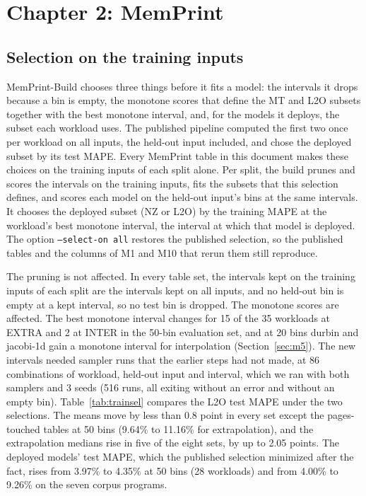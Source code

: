 \documentclass[11pt]{article}
\newcommand{\memprint}{MemPrint}
\begin{document}
\section{Chapter 2: \memprint{}}
\label{sec:ch2}

\subsection{Selection on the training inputs}
\label{sec:trainsel}

MemPrint-Build chooses three things before it fits a model: the intervals it drops because a bin is empty, the
monotone scores that define the MT and L2O subsets together with the best monotone interval, and, for the models it
deploys, the subset each workload uses. The published pipeline computed the first two once per workload on all
inputs, the held-out input included, and chose the deployed subset by its test MAPE. Every \memprint{} table in this
document makes these choices on the training inputs of each split alone. Per split, the build prunes and scores the
intervals on the training inputs, fits the subsets that this selection defines, and scores each model on the held-out
input's bins at the same intervals. It chooses the deployed subset (NZ or L2O) by the training MAPE at the workload's
best monotone interval, the interval at which that model is deployed. The option \texttt{--select-on all} restores
the published selection, so the published tables and the columns of M1 and M10 that rerun them still reproduce.

The pruning is not affected. In every table set, the intervals kept on the training inputs of each split are the
intervals kept on all inputs, and no held-out bin is empty at a kept interval, so no test bin is dropped. The
monotone scores are affected. The best monotone interval changes for 15 of the 35 workloads at EXTRA and 2 at INTER
in the 50-bin evaluation set, and at 20 bins durbin and jacobi-1d gain a monotone interval for interpolation
(Section~\ref{sec:m5}). The new intervals needed sampler runs that the earlier steps had not made, at 86
combinations of workload, held-out input and interval, which we ran with both samplers and 3 seeds (516 runs, all
exiting without an error and without an empty bin). Table~\ref{tab:trainsel} compares the L2O test MAPE under the
two selections. The means move by less than 0.8 point in every set except the pages-touched tables at 50 bins
(9.64\% to 11.16\% for extrapolation), and the extrapolation medians rise in five of the eight sets, by up to 2.05
points. The deployed models' test MAPE, which the published selection minimized after the fact, rises from 3.97\% to
4.35\% at 50 bins (28 workloads) and from 4.00\% to 9.26\% on the seven corpus programs.
\end{document}

